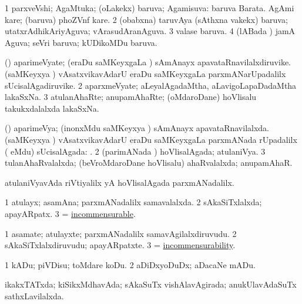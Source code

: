 \bentry
{}
\gl{\gu}
\bmng
\bnum
\num{1} parxveVshi; AgaMtuka; (oLakekx) baruva; Agamisuva:  baruva Barata.  AgAmi kare; (baruva) phoZVnf kare. 
\num{2} (obabxna) taruvAya (sAthxna \mo vakekx) baruva; utatxrAdhikAriyAguva; vArasudAranAguva. 
\num{3} valase baruva. 
\num{4} (lABada \vi) jamA Aguva; seVri baruva; kUDikoMDu baruva. 
\enum
\emng
\eentry

\bentry
{}
\gl{\nA}
\bmng
\bnum
{} (\ga) 
\banum
{} aparimeVyate; (eraDu saMKeyxgaLa \vi) sAmAnayx apavataRnavilalxdiruvike. 
 (saMKeyxya \vi) vAsatxvikavAdarU eraDu saMKeyxgaLa parxmANarUpadalilx sUcisalAgadiruvike. 
\eanum
\numie
\num{2} aparxmeVyate; aLeyalAgadaMtha, aLavigoLapaDadaMtha lakaSxNa. 
\num{3} atulanAhaRte; anupamAhaRte; (oMdaroDane) hoVlisalu takukxdalalxda lakaSxNa. 
\enum
\emng
\eentry

\bentry
{}
\gl{\gu}
\bmng
\bnum
{} (\ga) 
\banum
{} aparimeVya; (inonxMdu saMKeyxya \vi) sAmAnayx apavataRnavilalxda. 
 (saMKeyxya \vi) vAsatxvikavAdarU eraDu saMKeyxgaLa parxmANada rUpadalilx ( eMdu) sUcisalAgada: \eng{$\pi\sqrt\bg 2\eg$}. 
\eanum
\numie
\num{2} (parimANada \vi) hoVlisalAgada; atulaniVya. 
\num{3} tulanAhaRvalalxda; (beVroMdaroDane hoVlisalu) ahaRvalalxda; anupamAhaR. 
\enum
\emng
\eentry

\bentry
{}
\gl{\kirxvi}
\bmng
atulaniVyavAda riVtiyalilx yA hoVlisalAgada parxmANadalilx. 
\emng
\eentry

\bentry
{}
\gl{\gu}
\bmng
\bnum
\num{1} atulayx; asamAna; parxmANadalilx samavalalxda. 
\num{2} sAkaSiTxlalxda; apayARpatx. 
\num{3}  = \hyperlink{incommensurable}{incommensurable}. 
\enum
\emng
\eentry

\bentry
{}
\gl{\nA}
\bmng
\bnum
\num{1} asamate; atulayxte; parxmANadalilx samavAgilalxdiruvudu. 
\num{2} sAkaSiTxlalxdiruvudu; apayARpatxte. 
\num{3}  = \hyperlink{incommensurability}{incommensurability}. 
\enum
\emng
\eentry

\bentry
{}
\gl{\sakirx}
\bmng
\bnum
\num{1} kADu; piVDisu; toMdare koDu. 
\num{2} aDiDxyoDuDx; aDacaNe mADu. 
\enum
\emng
\eentry

\bentry
{}
\gl{\gu}
\bmng
ikakxTATxda; kiSikxMdhavAda; sAkaSuTx vishAlavAgirada; anukUlavAdaSuTx sathxLavilalxda. 
\emng
\eentry

